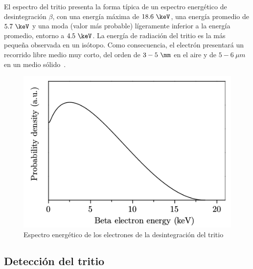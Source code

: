 El espectro del tritio presenta la forma típica de un espectro energético de desintegración $\beta$, con una energía máxima de $18.6~\keV$, una energía promedio de $5.7~\keV$ y una moda (valor más probable) lígeramente inferior a la energía promedio, entorno a $4.5~\keV$. La energía de radiación del tritio es la más pequeña observada en un  isótopo. Como consecuencia, el electrón presentará un recorrido libre medio muy corto, del orden de $3-5~\mm$ en el aire y de $5-6~\mu m$ en un medio sólido~\cite{Isotopos}.
\begin{figure}[hbtp]
\includegraphics[scale=0.6]{Espectro.png}
\centering
\caption{Espectro energético de los electrones de la desintegración del tritio ~\cite{TesisTritio}\label{fig:Espectrotritio}}
\end{figure}


\subsection{Detección del tritio}

